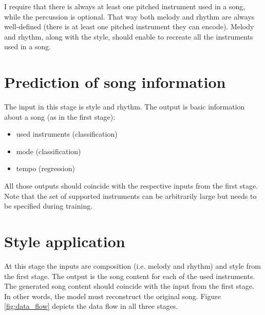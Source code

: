 \documentclass[en]{pracamgr}
\begin{document}
I require that there is always at least one pitched instrument used in a song, while the percussion is optional.
That way both melody and rhythm are always well-defined (there is at least one pitched instrument they can encode).
Melody and rhythm, along with the style, should enable to recreate all the instruments used in a song.

\section{Prediction of song information}

The input in this stage is style and rhythm.
The output is basic information about a song (as in the first stage):
\begin{itemize}
    \item used instruments (classification)
    \item mode (classification)
    \item tempo (regression)
\end{itemize}

All those outputs should coincide with the respective inputs from the first stage.
Note that the set of supported instruments can be arbitrarily large but needs to be specified during training.

\section{Style application}

At this stage the inputs are composition (i.e. melody and rhythm) and style from the first stage.
The output is the song content for each of the used instruments.
The generated song content should coincide with the input from the first stage.
In other words, the model must reconstruct the original song.
Figure \ref{fig:data_flow} depicts the data flow in all three stages.
\end{document}
